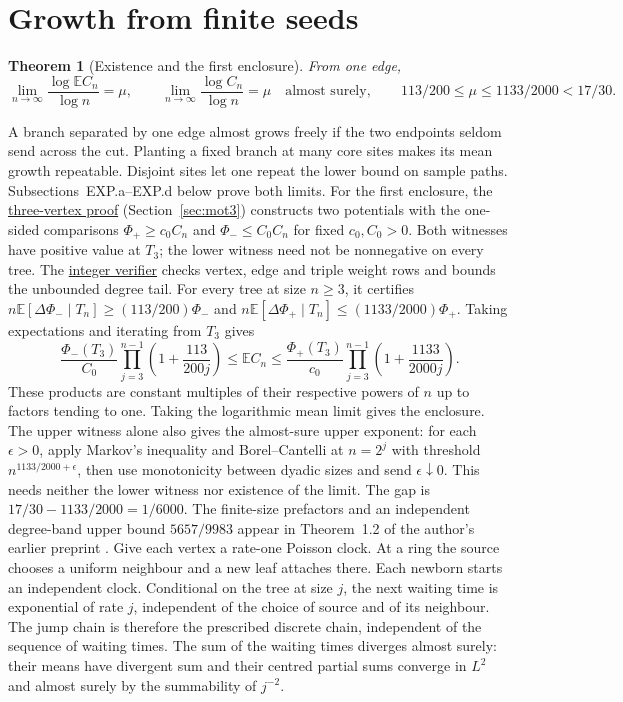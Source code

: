 \documentclass[11pt]{article}
\newcommand{\proofsrc}[2]{\href{https://github.com/uzay-eth/friend-tree-exponent/blob/a0972085ad72ad5685ae7b424988648d1965e73c/#1}{#2}}
\newtheorem{theorem}{Theorem}
\newcommand{\resulttag}{?}
\newcommand{\tagnext}[1]{\renewcommand{\resulttag}{#1}}
\theoremstyle{remark}
\numberwithin{equation}{section}
\newcommand{\E}{\mathbb E}
\begin{document}
\section{Growth from finite seeds}\label{sec:exist}
\tagnext{EXP}
\begin{theorem}[Existence and the first enclosure]\label{th:exist}
From one edge,
\[
 \lim_{n\to\infty}\frac{\log\E C_n}{\log n}=\mu,\qquad
 \lim_{n\to\infty}\frac{\log C_n}{\log n}=\mu\quad\text{almost surely},
 \qquad 113/200\le\mu\le1133/2000<17/30 .
\]
\end{theorem}
A branch separated by one edge almost grows freely if the two endpoints seldom send across the cut. Planting a fixed branch at many core sites makes its mean growth repeatable. Disjoint sites let one repeat the lower bound on sample paths. Subsections~EXP.a--EXP.d below prove both limits. For the first enclosure, the \proofsrc{proofs/bracket-motifs.md}{three-vertex proof} (Section~\ref{sec:mot3}) constructs two potentials with the one-sided comparisons $\Phi_+\ge c_0 C_n$ and $\Phi_-\le C_0 C_n$ for fixed $c_0,C_0>0$. Both witnesses have positive value at $T_3$; the lower witness need not be nonnegative on every tree. The \proofsrc{verify/motif-bracket/cert_verify_gmp.c}{integer verifier} checks vertex, edge and triple weight rows and bounds the unbounded degree tail. For every tree at size $n\ge3$, it certifies $n\E[\Delta\Phi_-\mid T_n]\ge(113/200)\Phi_-$ and $n\E[\Delta\Phi_+\mid T_n]\le(1133/2000)\Phi_+$. Taking expectations and iterating from $T_3$ gives
\[
 \frac{\Phi_-(T_3)}{C_0}\prod_{j=3}^{n-1}\left(1+\frac{113}{200j}\right)
 \le \E C_n \le
 \frac{\Phi_+(T_3)}{c_0}\prod_{j=3}^{n-1}\left(1+\frac{1133}{2000j}\right).
\]
These products are constant multiples of their respective powers of $n$ up to factors tending to one. Taking the logarithmic mean limit gives the enclosure. The upper witness alone also gives the almost-sure upper exponent: for each $\epsilon>0$, apply Markov's inequality and Borel--Cantelli at $n=2^j$ with threshold $n^{1133/2000+\epsilon}$, then use monotonicity between dyadic sizes and send $\epsilon\downarrow0$. This needs neither the lower witness nor existence of the limit. The gap is $17/30-1133/2000=1/6000$. The finite-size prefactors and an independent degree-band upper bound $5657/9983$ appear in Theorem~1.2 of the author's earlier preprint \cite{UzayFirst}.
Give each vertex a rate-one Poisson clock. At a ring the source chooses a uniform neighbour and a new leaf attaches there. Each newborn starts an independent clock. Conditional on the tree at size $j$, the next waiting time is exponential of rate $j$, independent of the choice of source and of its neighbour. The jump chain is therefore the prescribed discrete chain, independent of the sequence of waiting times. The sum of the waiting times diverges almost surely: their means have divergent sum and their centred partial sums converge in $L^2$ and almost surely by the summability of $j^{-2}$.
\end{document}
